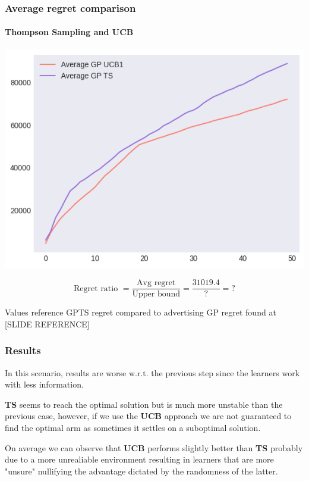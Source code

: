 \begin{frame}[plain]

\frametitle{Average regret comparison}
\framesubtitle{Thompson Sampling and UCB}

\begin{center}
	\includegraphics[scale=0.45]{img/Graphs/uncertain_alpha_unit/image6.png}
\end{center}

\begin{displaymath}
	\text{Regret ratio } = \frac{\text{Avg regret}}{\text{Upper bound}} = \frac{31019.4}{?} = ?
\end{displaymath}

\scriptsize Values reference GPTS regret compared to advertising GP regret found at [SLIDE REFERENCE]


\end{frame}


\begin{frame}

\frametitle{Results}

In this scenario, results are worse w.r.t. the previous step since the learners work with less information.

\textbf{TS} seems to reach the optimal solution but is much more unstable than the previous case, however, if we use the \textbf{UCB} approach we are not guaranteed to find the optimal arm as sometimes it settles on a suboptimal solution.

On average we can observe that \textbf{UCB} performs slightly better than \textbf{TS} probably due to a more unrealiable environment resulting in learners that are more "unsure" nullifying the advantage dictated by the randomness of the latter.

\end{frame}

